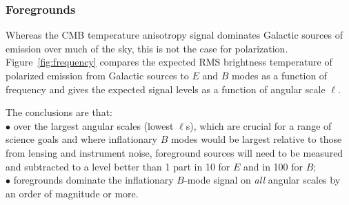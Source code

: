 \vspace{-0.18in}

\subsubsection{Foregrounds}
\label{sec:foregrounds}

\vspace{-0.05in}

Whereas the CMB temperature anisotropy signal dominates Galactic sources
of emission over much of the sky, this is not the case for polarization. 
Figure~\ref{fig:frequency} compares the expected RMS brightness temperature 
of polarized emission from Galactic sources to $E$ and $B$ modes
as a function of frequency and gives the expected signal levels as a function of angular scale $\ell$.  

\noindent The conclusions are that: \\
$\bullet$ \hspace{0.05in} over the largest angular scales (lowest $\ell$s), which are crucial for a range 
of science goals and where inflationary $B$ modes 
would be largest relative to those from lensing and instrument noise, foreground sources 
will need to be measured and subtracted to a level better than 1 part in 10 for $E$ and in 100 for $B$; \\
$\bullet$ \hspace{0.05in} foregrounds dominate the inflationary $B$-mode signal on {\it all} angular 
scales by an order of magnitude or more.

